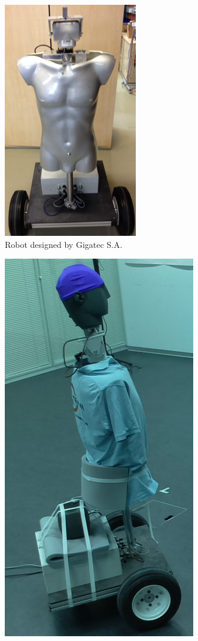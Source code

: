 \begin{figure}
    \centering
    \begin{subfigure}{0.3\linewidth}
        \centering
        \includegraphics[height=0.3\textheight]{files/Robot.png}
        \caption{Robot designed by Gigatec S.A.}
        \label{fig:robot}
    \end{subfigure}
    \hspace{0.5em}
    \begin{subfigure}{0.3\linewidth}
        \centering
        \includegraphics[height=0.3\textheight]{files/Robot2.png}

\end{subfigure}
\end{figure}
